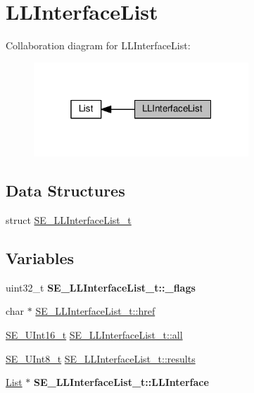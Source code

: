 \hypertarget{group__LLInterfaceList}{}\section{L\+L\+Interface\+List}
\label{group__LLInterfaceList}
Collaboration diagram for L\+L\+Interface\+List\+:\nopagebreak
\begin{figure}[H]
\begin{center}
\leavevmode
\includegraphics[width=229pt]{group__LLInterfaceList}
\end{center}
\end{figure}
\subsection*{Data Structures}
\begin{DoxyCompactItemize}
\item 
struct \hyperlink{structSE__LLInterfaceList__t}{S\+E\+\_\+\+L\+L\+Interface\+List\+\_\+t}
\end{DoxyCompactItemize}
\subsection*{Variables}
\begin{DoxyCompactItemize}
\item 
\mbox{\label{group__LLInterfaceList_gae576634dc9bd3e2f27486dc4b16e1001}} 
uint32\+\_\+t {\bfseries S\+E\+\_\+\+L\+L\+Interface\+List\+\_\+t\+::\+\_\+flags}
\item 
char $\ast$ \hyperlink{group__LLInterfaceList_gaffb34fa53a2595c094d76738fe29e7be}{S\+E\+\_\+\+L\+L\+Interface\+List\+\_\+t\+::href}
\item 
\hyperlink{group__UInt16_gac68d541f189538bfd30cfaa712d20d29}{S\+E\+\_\+\+U\+Int16\+\_\+t} \hyperlink{group__LLInterfaceList_ga3ce3494c72fc68465b2be53fb184ba19}{S\+E\+\_\+\+L\+L\+Interface\+List\+\_\+t\+::all}
\item 
\hyperlink{group__UInt8_gaf7c365a1acfe204e3a67c16ed44572f5}{S\+E\+\_\+\+U\+Int8\+\_\+t} \hyperlink{group__LLInterfaceList_ga1e311149c0035e37d619f777697b2602}{S\+E\+\_\+\+L\+L\+Interface\+List\+\_\+t\+::results}
\item 
\mbox{\label{group__LLInterfaceList_ga05e6b504b09bc7974841565117af0f77}} 
\hyperlink{structList}{List} $\ast$ {\bfseries S\+E\+\_\+\+L\+L\+Interface\+List\+\_\+t\+::\+L\+L\+Interface}
\end{DoxyCompactItemize}


